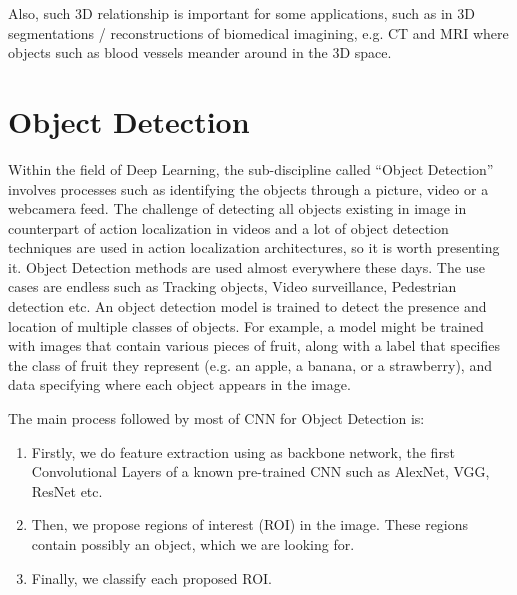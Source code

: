 Also, such 3D relationship is important for some applications, such as in 3D segmentations / reconstructions of biomedical imagining,
e.g. CT and MRI where objects such as blood vessels meander around in the 3D space.

\section{Object Detection}
Within the field of Deep Learning, the sub-discipline called ``Object Detection'' involves processes such as identifying the objects through a picture, video or a webcamera feed. The challenge of detecting all objects existing in image in counterpart of action localization in videos and
a lot of object detection techniques are used in action localization architectures, so it is worth presenting it.
Object Detection methods are used almost everywhere these days. The use cases are endless such as Tracking objects, Video surveillance, Pedestrian detection etc. 
An object detection model is trained to detect the presence and location of multiple classes of objects. For example, a model might be trained with images that
contain various pieces of fruit, along with a label that specifies the class of fruit they represent (e.g. an apple, a banana, or a strawberry),
and data specifying where each object appears in the image.

The main process followed by most of CNN for Object Detection is:
\begin{enumerate}
\item Firstly, we do feature extraction using as backbone network, the first Convolutional Layers of a known pre-trained CNN such
  as AlexNet, VGG, ResNet etc.
\item Then, we propose regions of interest (ROI) in the image. These regions contain possibly an object, which we are looking for.
\item Finally, we classify each proposed ROI.
\end{enumerate}

